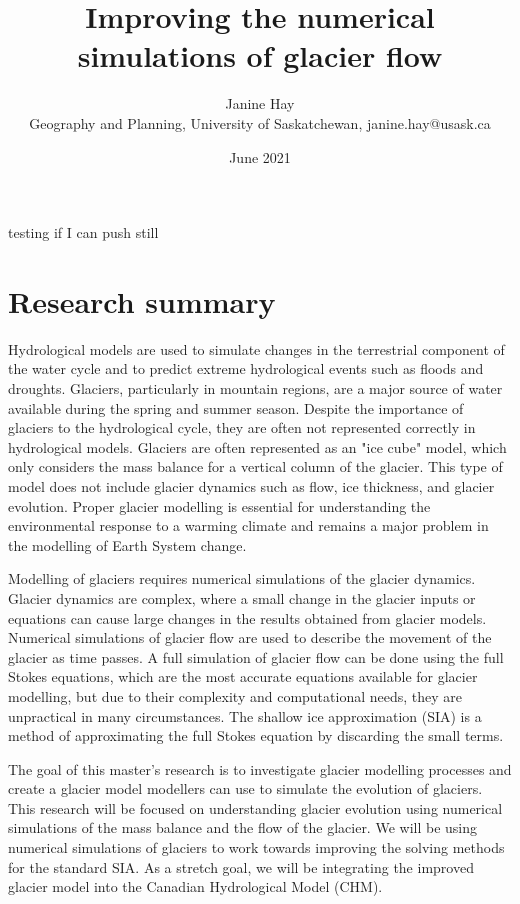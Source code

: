 \documentclass{article}
\title{Improving the numerical simulations of glacier flow}
\author{Janine Hay \\
        \small Geography and Planning, University of Saskatchewan, janine.hay@usask.ca\\

}
\date{June 2021} %
\begin{document}
\maketitle
\newpage
\tableofcontents
\newpage
testing if I can push still
\section{Research summary}
Hydrological models are used to simulate changes in the terrestrial component of the water cycle and to predict extreme hydrological events such as floods and droughts. Glaciers, particularly in mountain regions, are a major source of water available during the spring and summer season. Despite the importance of glaciers to the hydrological cycle, they are often not represented correctly in hydrological models. Glaciers are often represented as an "ice cube" model, which only considers the mass balance for a vertical column of the glacier. This type of model does not include glacier dynamics such as flow, ice thickness, and glacier evolution. Proper glacier modelling is essential for understanding the environmental response to a warming climate and remains a major problem in the modelling of Earth System change.  

Modelling of glaciers requires numerical simulations of the glacier dynamics. Glacier dynamics are complex, where a small change in the glacier inputs or equations can cause large changes in the results obtained from glacier models. Numerical simulations of glacier flow are used to describe the movement of the glacier as time passes. A full simulation of glacier flow can be done using the full Stokes equations, which are the most accurate equations available for glacier modelling, but due to their complexity and computational needs, they are unpractical in many circumstances. The shallow ice approximation (SIA) is a method of approximating the full Stokes equation by discarding the small terms.

The goal of this master's research is to investigate glacier modelling processes and create a glacier model modellers can use to simulate the evolution of glaciers. This research will be focused on understanding glacier evolution using numerical simulations of the mass balance and the flow of the glacier. We will be using numerical simulations of glaciers to work towards improving the solving methods for the standard SIA. As a stretch goal, we will be integrating the improved glacier model into the Canadian Hydrological Model (CHM).
\end{document}

